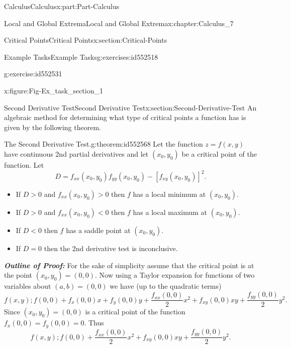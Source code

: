 \documentclass[oneside,10pt,]{book}
\newcommand{\alert}[1]{\textbf{\textit{#1}}}
\numberwithin{equation}{section}
\begin{document}
\begin{partptx}{Calculus}{}{Calculus}{}{}{x:part:Part-Calculus}
\begin{chapterptx}{Local and Global Extrema}{}{Local and Global Extrema}{}{}{x:chapter:Calculus_7}
\begin{sectionptx}{Critical Points}{}{Critical Points}{}{}{x:section:Critical-Points}
\begin{exercises-subsection-numberless}{Example Tasks}{}{Example Tasks}{}{}{g:exercises:id552518}
\begin{divisionexercise}{1}{}{}{g:exercise:id552531}
\begin{figureptx}{}{x:figure:Fig-Ex_task_section_1}{}
\begin{image}{0.1}{0.8}{0.1}
\end{image}%
\tcblower
\end{figureptx}%
\end{divisionexercise}%
\end{exercises-subsection-numberless}
\end{sectionptx}
%
%
\typeout{************************************************}
\typeout{************************************************}
%
\begin{sectionptx}{Second Derivative Test}{}{Second Derivative Test}{}{}{x:section:Second-Derivative-Test}
An algebraic method for determining what type of critical points a function has is given by the following theorem.%
\begin{theorem}{The Second Derivative Test.}{}{g:theorem:id552568}%
Let the function \(z=f(x,y)\) have continuous 2nd partial derivatives and let \((x_0,y_0)\) be a critical point of the function. Let%
\begin{equation*}
D = f_{xx} (x_0,y_0) f_{yy} (x_0,y_0) - \left[ f_{xy} (x_0,y_0) \right]^2\text{.}
\end{equation*}
%
\par
%
\begin{itemize}[label=\textbullet]
\item{}If \(D>0\) and \(f_{xx} (x_0,y_0) >0\) then \(f\) has a local minimum at \((x_0,y_0)\).%
\item{}If \(D>0\) and \(f_{xx} (x_0,y_0) < 0\) then \(f\) has a local maximum at \((x_0,y_0)\).%
\item{}If \(D < 0\) then \(f\) has a saddle point at \((x_0,y_0)\).%
\item{}If \(D=0\) then the 2nd derivative test is inconclusive.%
\end{itemize}
%
\end{theorem}
\alert{Outline of Proof:} For the sake of simplicity assume that the critical point is at the point \((x_0,y_0)=(0,0)\). Now using a Taylor expansion for functions of two variables about \((a,b) = (0,0)\) we have (up to the quadratic terms)%
\begin{equation*}
f(x,y); f(0,0) + f_x (0,0)x + f_y (0,0) y + \dfrac{f_{xx}(0,0)}{2} x^2 + f_{xy} (0,0) xy + \dfrac{f_{yy}(0,0)}{2} y^2\text{.}
\end{equation*}
Since \((x_0,y_0) = (0,0)\) is a critical point of the function \(f_x (0,0) = f_y (0,0) = 0\). Thus%
\begin{equation*}
f(x,y); f(0,0) + \dfrac{f_{xx}(0,0)}{2}x^2 + f_{xy} (0,0) xy + \dfrac{f_{yy} (0,0)}{2}y^2\text{.}

\end{equation*}
\end{sectionptx}
\end{chapterptx}
\end{partptx}
\end{document}

